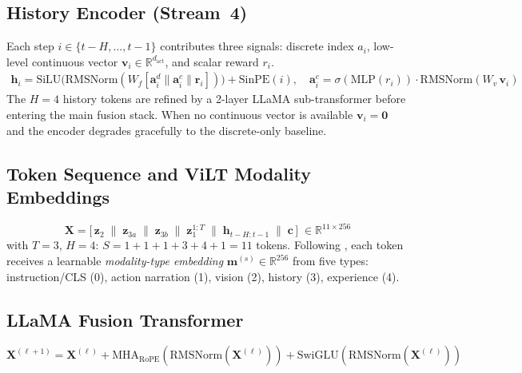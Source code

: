 \documentclass{article}
\begin{document}
\subsection{History Encoder (Stream~4)}

Each step $i\in\{t{-}H,\ldots,t{-}1\}$ contributes three signals:
discrete index $a_i$, low-level continuous vector $\mathbf{v}_i\in\mathbb{R}^{d_{\mathrm{act}}}$,
and scalar reward $r_i$.
\begin{align}
  \mathbf{h}_i = \mathrm{SiLU}\!\bigl(
    \mathrm{RMSNorm}(W_f[\mathbf{a}_i^{d}\|\mathbf{a}_i^{c}\|\mathbf{r}_i])
  \bigr) + \mathrm{SinPE}(i),
  \quad \mathbf{a}_i^{c} = \sigma(\mathrm{MLP}(r_i))\cdot\mathrm{RMSNorm}(W_v\,\mathbf{v}_i)
  \label{eq:hist_tok}
\end{align}
The $H{=}4$ history tokens are refined by a 2-layer LLaMA sub-transformer
before entering the main fusion stack.
When no continuous vector is available $\mathbf{v}_i{=}\mathbf{0}$ and the
encoder degrades gracefully to the discrete-only baseline.

\subsection{Token Sequence and ViLT Modality Embeddings}
\label{sec:tokens}
\begin{equation}
  \mathbf{X} = \bigl[\,
    \mathbf{z}_2 \;\|\; \mathbf{z}_{3a} \;\|\; \mathbf{z}_{3b} \;\|\;
    \mathbf{z}_1^{1:T} \;\|\; \mathbf{h}_{t-H:t-1} \;\|\; \mathbf{c}
  \,\bigr] \;\in\mathbb{R}^{11\times256}
  \label{eq:sequence}
\end{equation}
with $T{=}3$, $H{=}4$: $S = 1{+}1{+}1{+}3{+}4{+}1 = 11$ tokens.
Following \citet{kim2021vilt}, each token receives a learnable
\emph{modality-type embedding} $\mathbf{m}^{(s)}\!\in\!\mathbb{R}^{256}$
from five types: instruction/CLS (0), action narration (1), vision (2),
history (3), experience (4).

\subsection{LLaMA Fusion Transformer}
\label{sec:fusion}
\begin{equation}
  \mathbf{X}^{(\ell+1)}
  = \mathbf{X}^{(\ell)}
  + \mathrm{MHA}_{\mathrm{RoPE}}\!\left(\mathrm{RMSNorm}(\mathbf{X}^{(\ell)})\right)
  + \mathrm{SwiGLU}\!\left(\mathrm{RMSNorm}(\mathbf{X}^{(\ell)})\right)
  \label{eq:llama}
\end{equation}
\end{document}
